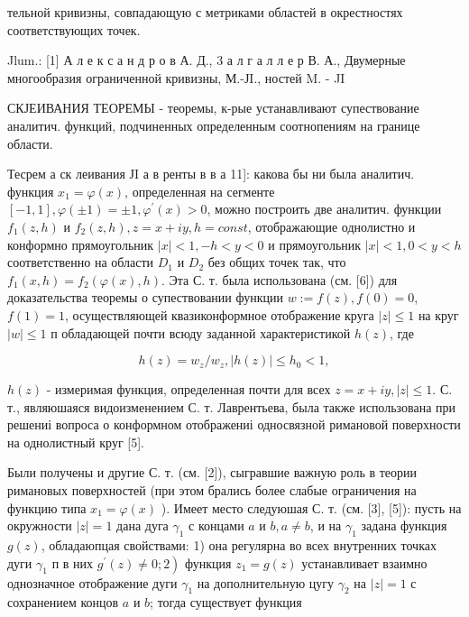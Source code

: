 \documentclass[10pt]{article}
\begin{document}
тельной кривизны, совпадающую с метриками областей в окрестностях соответствующих точек.



Jlum.: [1] А л е к с а н д р о в А. Д., 3 а л г а л л е р В. А., Двумерные многообразия ограниченной кривизны, М.-ЈI., ностей M. - JI



СКЈЕИВАНИЯ ТЕОРЕМЫ - теоремы, к-рые устанавливают супествование аналитич. функций, подчиненных определенным соотнопениям на границе области.



Тесрем а ск леивания ЈI а в ренты в в а 11]: какова бы ни была аналитич. функция $x_{1}=\varphi(x)$, определенная на сегменте $[-1,1], \varphi( \pm 1)= \pm 1, \varphi^{\prime}(x)>0$, можно построить две аналитич. функции $f_{1}(z, h)$ и $f_{2}(z, h), z=x+i y, h=c o n s t$, отображающие однолистно и конформно прямоугольник $|x|<1,-h<y<0$ и прямоугольник $|x|<1,0<y<h$ соответственно на области $D_{1}$ и $D_{2}$ без общих точек так, что $f_{1}(x, h)=f_{2}(\varphi(x), h)$. Эта С. т. была использована (см. [6]) для доказательства теоремы о супествовании функции $w:=f(z), f(0)=0$, $f(1)=1$, осуществляющей квазиконформное отображение круга $|z| \leqslant 1$ на круг $|w| \leqslant 1$ п обладающей почти всюду заданной характеристикой $h(z)$, где



\[

h(z)=w_{z} / w_{z},|h(z)| \leqslant h_{0}<1,

\]



$h(z)$ - измеримая функция, определенная почти для всех $z=x+i y,|z| \leqslant 1$. С. т., являюшаяся видоизменением С. т. Лаврентьева, была также использована при решениі вопроса о конформном отображениі односвязной римановой поверхности на однолистный круг [5].



Были получены и другие С. т. (см. [2]), сыгравшие важную роль в теории римановых поверхностей (при этом брались более слабые ограничения на функцию типа $x_{1}=\varphi(x)$ ). Имеет место следуюшая С. т. (см. [3], [5]): пусть на окружности $|z|=1$ дана дуга $\gamma_{1}$ с концами $a$ и $b, a \neq b$, и на $\gamma_{1}$ задана функция $g(z)$, обладаюпцая свойствами: 1) она регулярна во всех внутренних точках дуги $\gamma_{1}$ п в них $\left.g^{\prime}(z) \neq 0 ; 2\right)$ функция $z_{1}=g(z)$ устанавливает взаимно однозначное отображение дуги $\gamma_{1}$ на дополнительную цугу $\gamma_{2}$ на $|z|=1$ с сохранением концов $a$ и $b$; тогда существует функция
\end{document}
